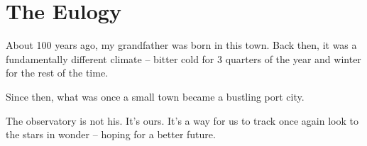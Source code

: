 \chapter{The Eulogy}

About 100 years ago, my grandfather was born in this town.
Back then, it was a fundamentally different climate -- bitter cold for 3 quarters of the year and winter for the rest of the time.

Since then, what was once a small town became a bustling port city.

The observatory is not his.
It's ours.
It's a way for us to track once again look to the stars in wonder -- hoping for a better future.

